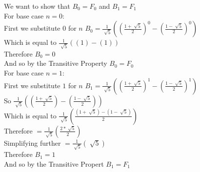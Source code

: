 \documentclass{article}
\begin{document}
	We want to show that $B_0=F_0$ and $B_1=F_1$
	\\
	For base case $n=0$:
	\\
	First we substitute $0$ for $n$ $B_0=\frac{1}{\sqrt[]{5}}((\frac{1+\sqrt[]{5}}{2})^0-(\frac{1-\sqrt[]{5}}{2})^0)$
	\\
	Which is equal to $\frac{1}{\sqrt[]{5}}((1)-(1))$
	\\
	Therefore $B_0=0$
	\\
	And so by the Transitive Property $B_0=F_0$
	\\
	For base case $n=1$:
	\\
	First we substitute $1$ for $n$ $B_1=\frac{1}{\sqrt[]{5}}((\frac{1+\sqrt[]{5}}{2})^1-(\frac{1-\sqrt[]{5}}{2})^1)$
	\\
	So $\frac{1}{\sqrt[]{5}}((\frac{1+\sqrt[]{5}}{2})-(\frac{1-\sqrt[]{5}}{2}))$
	\\
	Which is equal to $\frac{1}{\sqrt[]{5}}(\frac{(1+\sqrt[]{5})-(1-\sqrt[]{5})}{2})$
	\\
	Therefore $=\frac{1}{\sqrt[]{5}}(\frac{2*\sqrt[]{5}}{2})$
	\\
	Simplifying further $=\frac{1}{\sqrt[]{5}}(\sqrt[]{5})$
	\\
	Therefore $B_1=1$ 
	\\
	And so by the Transitive Propert $B_1=F_1$
\end{document}
